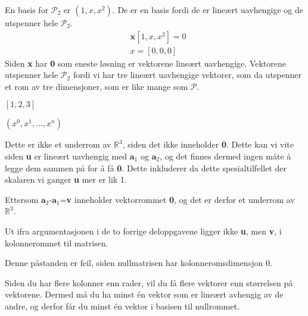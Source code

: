 \documentclass[11pt, a4paper, norsk]{NTNUoving}
\begin{document}
\begin{oppgave}
    \begin{punkt}
        En basis for $\mathcal{P}_2$ er $(1, x, x^2)$. De er en basis fordi de er lineært uavhengige og de utspenner hele $\mathcal{P}_2$.
        \begin{align*}
            &\textbf{x}[1, x, x^2]=0\\
            &x=[0,0,0]
        \end{align*}
        Siden \textbf{x} har \textbf{0} som eneste løsning er vektorene lineært uavhengige. 
        Vektorene utspenner hele $\mathcal{P}_2$ fordi vi har tre lineært uavhengige vektorer, som da utspenner et rom av tre dimensjoner, som er like mange som $\mathcal{P}$.
    \end{punkt}
    \begin{punkt}
    $[1,2,3]$
    \end{punkt}
    \begin{punkt}
    $(x^0, x^1, ... , x^n)$
    \end{punkt}
\end{oppgave}
\begin{oppgave}
\begin{punkt}
    Dette er ikke et underrom av $\mathbb{R}^3$, siden det ikke inneholder \textbf{0}. Dette kan vi vite siden \textbf{u} er lineært uavhengig med $\textbf{a}_1$ og $\textbf{a}_2$, og det finnes dermed ingen måte å legge dem sammen på for å få \textbf{0}. Dette inkluderer da dette spesialtilfellet der skalaren vi ganger \textbf{u} mer er lik 1. 
\end{punkt}
\begin{punkt}
Ettersom $\textbf{a}_2$-$\textbf{a}_1$=\textbf{v} inneholder vektorrommet \textbf{0}, og det er derfor et underrom av $\mathbb{R}^3$.
\end{punkt}
\begin{punkt}
Ut ifra argumentasjonen i de to forrige deloppgavene ligger ikke \textbf{u}, men \textbf{v}, i kolonnerommet til matrisen. 
\end{punkt}
\end{oppgave}
\begin{oppgave}
    \begin{punkt}
        Denne påstanden er feil, siden nullmatrisen har kolonneromsdimensjon 0.
    \end{punkt}
    \begin{punkt}
        Siden du har flere kolonner enn rader, vil du få flere vektorer enn størrelsen på vektorene. Dermed må du ha minst én vektor som er lineært avhengig av de andre, og derfor får du minst én vektor i basisen til nullrommet. 
    \end{punkt}
\end{oppgave}
\end{document}
